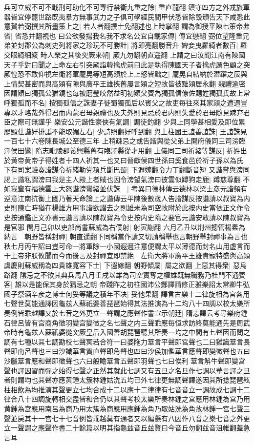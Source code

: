 兵可立威不可不戢刑可助化不可專行禁衛九重之餘|{
	重直龍翻}
鎮守四方之外戎旅軍器皆宜停罷世路既夷羣方無事武力之子俱可學經民間甲伏悉皆除毁頒告天下咸悉此意賀若弼撰其所畫策上之|{
	若人者翻撰士免翻述也上時掌翻}
謂為御授平陳七策帝弗省|{
	省悉井翻視也}
曰公欲發揚我名我不求名公宜自載家傳|{
	傳宜戀翻}
弼位望隆重兄弟並封郡公為刺史列將家之珍玩不可勝計|{
	將即亮翻勝音升}
婢妾曳羅綺者數百|{
	羅交眼綺細綾}
時人榮之其後突厥來朝|{
	厥九勿翻朝直遥翻}
上謂之曰汝聞江南有陳國天子乎對曰聞之上命左右引突厥詣韓擒虎前曰此是執得陳國天子者擒虎厲色顧之突厥惶恐不敢仰視左衛將軍龎晃等短高熲於上上怒皆黜之|{
	龎晃自結納於潜躍之辰與上情契甚密而與高熲有隙與廣平王雄挾舊屢言熲之短故皆被黜熲居永翻}
親禮逾密因謂熲曰獨孤公猶鏡也每被磨瑩皎然益明初熲父賓為獨孤信僚佐賜姓獨孤氏故上常呼獨孤而不名|{
	按獨孤信之誅妻子徙蜀獨孤后以賓父之故吏每往來其家熲之遭遇豈專以才略哉外得君而内蒙君母親禮也及夫外則見忌於君内則失愛於君母隨見踈弃君臣之際可無謹乎}
樂安公元諧性豪俠有氣調|{
	調徒釣翻}
少與上同學甚相愛及即位累歷顯仕諧好排詆不能取媚左右|{
	少詩照翻好呼到翻}
與上柱國王誼善誼誅|{
	王誼誅見一百七十六卷陳長城公至德三年}
上稍疎忌之或告諧與從父弟上開府儀同三司滂臨澤侯田鸞|{
	隋志毗陵郡義興縣舊有臨澤縣從才用翻}
上儀同三司祈緒等謀反|{
	祈姓出於黄帝黄帝子得姓者十四人祈其一也又曰晉獻侯四世孫曰奚食邑於祈子孫以為氏}
下有司案驗奏諧謀令祈緒勒党項兵斷巴蜀|{
	下遐嫁翻令力丁翻斷音短}
又諧嘗與滂同謁上諧私謂滂曰我是主人殿上者賊也因令滂望氣滂曰彼雲似蹲狗走鹿|{
	蹲慈尊翻}
不如我輩有福德雲上大怒諧滂鸞緒並伏誅　|{
	考異曰德林傳云德林以梁士彦元諧頻有逆意江南抗衡上國乃著天命論上之諧傳云平陳後數歲人告諧謀反按諧請以叔寶為内史則陳亡時猶在楊雄方用事諧欲譛去之則雄未為司空故附於此按内史當依正文作令史按通鑑正文亦書元諧言請以陳叔寶為令史按内史隋之要官元諧安敢請以陳叔寶為是官邪}
閏月己卯以吏部尚書蘇威為右僕射|{
	射寅謝翻}
六月乙丑以荆州摠管楊素為納言　朝野皆稱封禪|{
	朝直遥翻下同稱當作請又切請稱舉也言朝野舉封禪事為言也}
秋七月丙午詔曰豈可命一將軍除一小國遐邇注意便謂太平以薄德而封名山用虚言而干上帝非朕攸聞而今而後言及封禪宜即禁絶　左衛大將軍廣平王雄貴寵特盛與高熲虞慶則蘇威稱為四貴雄寛容下士|{
	下遐嫁翻}
朝野傾屬|{
	屬之欲翻}
上惡其得衆|{
	惡烏路翻}
隂忌之不欲其典兵馬八月壬戌以雄為司空實奪之權雄既無職務乃杜門不通賓客|{
	雄以是能保其身於猜忌之朝}
帝踐阼之初柱國沛公鄭譯請修正雅樂詔太常卿牛弘國子祭酒辛彦之博士何妥等議之積年不决|{
	妥他果翻}
譯言古樂十二律旋相為宫各用七聲世莫能通譯因龜兹人蘇祇婆善琵琶始得其法推演為十二均八十四調以校太樂所奏例皆乖越譯又於七音之外更立一聲謂之應聲作書宣示朝廷|{
	隋志譯云考尋樂府鍾石律呂皆有宫商角徵羽變宫變徵之名七聲之内三聲乖應每恒求訪終莫能通先是周武帝時有龜兹人蘇祇婆從突厥皇后入國善胡琵琶聽其所奏一均之中間有七聲因而問之調有七種以其七調勘校七聲冥若合符一曰婆陁力華言平聲即宫聲也二曰雞識華言長聲即南呂聲也三曰沙識華言質直聲即角聲也四曰沙侯加儖華言應聲即變徵聲也五曰沙臘華言應和聲即徵聲也六曰般瞻華言五聲即羽聲也七曰俟利華言斛牛聲即變宫聲也譯因習而彈之始得七聲之正然其就此七調又有五旦之名旦作七調以華言譯之旦者則謂均也其聲亦應黄鍾太簇林鍾姑洗五均已外七律更無調聲譯遂因其所捻琵琶絃柱相飲為均推演其聲更立七均合成十二以應十二律律有七音音立一調故成七調十二律合八十四調旋轉相交盡皆和合仍以其聲考校太樂所奏林鍾之宫應用林鍾為宫乃用黄鍾為宫應用南呂為商乃用太簇為商應用應鍾為角乃取姑洗為角故林鍾一宫七聲三聲並戾其十一宫七十七音例皆乖越莫有通者又以編懸有八因作八音之樂七音之外更立一聲謂之應聲作書二十餘篇以明其指龜兹音丘兹賢曰今音丘勿翻兹音沮帷翻蓋急言耳}
